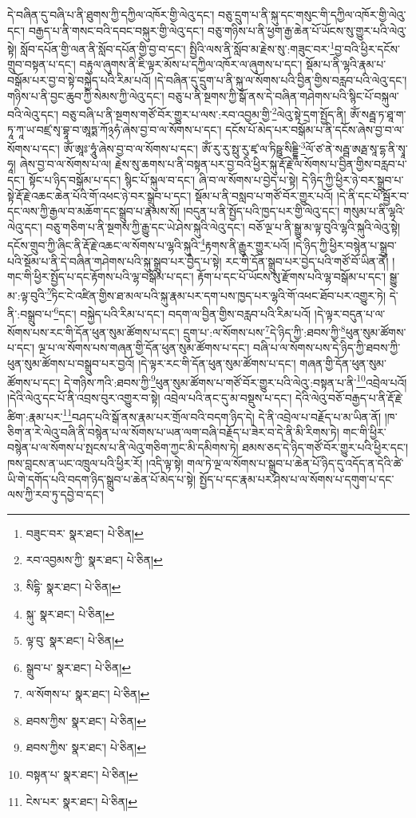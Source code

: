 དེ་བཞིན་དུ་བཞི་པ་ནི་ཐུགས་ཀྱི་དཀྱིལ་འཁོར་གྱི་ལེའུ་དང་། བཅུ་དྲུག་པ་ནི་སྐུ་དང་གསུང་གི་དཀྱིལ་འཁོར་གྱི་ལེའུ་དང་། བརྒྱད་པ་ནི་གསང་བའི་དབང་བསྐུར་གྱི་ལེའུ་དང་། བཅུ་གཉིས་པ་ནི་ཕྱག་རྒྱ་ཆེན་པོ་ཡོངས་སུ་གྱུར་པའི་ལེའུ་སྟེ། སློབ་དཔོན་གྱི་ལན་ནི་སློབ་དཔོན་གྱི་བྱ་བ་དང་། སྤྱིའི་ལས་ནི་སློབ་མ་རྗེས་སུ་:གཟུང་བར་\footnote{བཟུང་བར་  སྣར་ཐང་།  པེ་ཅིན། }བྱ་བའི་ཕྱིར་དངོས་གྲུབ་བསྟན་པ་དང་། བརྟུལ་ཞུགས་ནི་ཇི་ལྟར་མོས་པ་དཀྱིལ་འཁོར་ལ་ཞུགས་པ་དང་། སྡོམ་པ་ནི་ལྷའི་རྣམ་པ་བསྒོམ་པར་བྱ་བ་སྟེ་བསྐྱེད་པའི་རིམ་པའོ། །དེ་བཞིན་དུ་དྲུག་པ་ནི་སྐུ་ལ་སོགས་པའི་བྱིན་གྱིས་བརླབ་པའི་ལེའུ་དང་། གཉིས་པ་ནི་བྱང་ཆུབ་ཀྱི་སེམས་ཀྱི་ལེའུ་དང་། བཅུ་པ་ནི་སྔགས་ཀྱི་སྒོ་ནས་དེ་བཞིན་གཤེགས་པའི་སྙིང་པོ་བསྐུལ་བའི་ལེའུ་དང་། བཅུ་བཞི་པ་ནི་སྔགས་གཙོ་བོར་གྱུར་པ་ལས་:རབ་འབྱམ་གྱི་\footnote{རབ་འབྱམས་ཀྱི་  སྣར་ཐང་།  པེ་ཅིན། }ལེའུ་སྟེ་དྲག་སྤྱོད་ནི། ཨོཾ་སརྦྦ་ཏ་ཐཱ་ག་ཏཱ་ཀཱ་ཡ་བཛྲ་སྭ་བྷཱ་བ་ཨཱཏྨ་ཀོ྅ཧཾ་ཞེས་བྱ་བ་ལ་སོགས་པ་དང་། དངོས་པོ་མེད་པར་བསྒོམ་པ་ནི་དངོས་ཞེས་བྱ་བ་ལ་སོགས་པ་དང་། ཨོཾ་ཨཱཿ་ཧཱུཾ་ཞེས་བྱ་བ་ལ་སོགས་པ་དང་། ཨོཾ་རུ་རུ་སྥུ་རུ་ཛྭ་ལ་ཏིཥྛ་སིདྡྷི་\footnote{སིདྷི་  སྣར་ཐང་།  པེ་ཅིན། }ལོ་ཙ་ནེ་སརྦྦ་ཨརྠ་སཱ་དྷ་ནི་སྭཱ་ཧཱ། ཞེས་བྱ་བ་ལ་སོགས་པ་ལ། རྗེས་སུ་ཆགས་པ་ནི་བསྟན་པར་བྱ་བའི་ཕྱིར་སྐུ་རྡོ་རྗེ་ལ་སོགས་པ་བྱིན་གྱིས་བརླབ་པ་དང་། སྟོང་པ་ཉིད་བསྒོམ་པ་དང་། སྙིང་པོ་སྐུལ་བ་དང་། ཞི་བ་ལ་སོགས་པ་བྱེད་པ་སྟེ། དེ་ཉིད་ཀྱི་ཕྱིར་ཉེ་བར་སྒྲུབ་པ་སྟེ་རྡོ་རྗེ་འཆང་ཆེན་པོའི་གོ་འཕང་ཉེ་བར་སྒྲུབ་པ་དང་། སྡོམ་པ་ནི་བསླབ་པ་གཙོ་བོར་གྱུར་པའོ། །དེ་ནི་དང་པོ་སྦྱོར་བ་དང་ལས་ཀྱི་རྒྱལ་བ་མཆོག་དང་སྒྲུབ་པ་རྣམས་སོ། །བདུན་པ་ནི་སྤྱོད་པའི་ཁྱད་པར་གྱི་ལེའུ་དང་། གསུམ་པ་ནི་ལྷའི་ལེའུ་དང་། བཅུ་གཅིག་པ་ནི་སྔགས་ཀྱི་རྒྱུ་དང་ཡེ་ཤེས་སྐུའི་ལེའུ་དང་། བཅོ་ལྔ་པ་ནི་སྒྱུ་མ་ལྟ་བུའི་ལྷའི་སྐུའི་ལེའུ་སྟེ། དངོས་གྲུབ་ཀྱི་ཞིང་ནི་རྡོ་རྗེ་འཆང་ལ་སོགས་པ་ལྷའི་སྐུའི་\footnote{སྐུ་  སྣར་ཐང་།  པེ་ཅིན། }རྟགས་ནི་རྒྱུར་གྱུར་པའོ། །དེ་ཉིད་ཀྱི་ཕྱིར་བསྙེན་པ་སྒྲུབ་པའི་སྡོམ་པ་ནི་དེ་བཞིན་གཤེགས་པའི་སྐུ་སྒྲུབ་པར་བྱེད་པ་སྟེ། རང་གི་དོན་སྒྲུབ་པར་བྱེད་པའི་གཙོ་བོ་ཡིན་ནོ། །གང་གི་ཕྱིར་སྤྱོད་པ་དང་རྟོགས་པའི་ལྷ་བསྒོམ་པ་དང་། རྟོག་པ་དང་པོ་ཡོངས་སུ་རྫོགས་པའི་ལྷ་བསྒོམ་པ་དང་། སྒྱུ་མ་:ལྟ་བུའི་\footnote{ལྟ་བུ་  སྣར་ཐང་།  པེ་ཅིན། }ཏིང་ངེ་འཛིན་གྱིས་ཐ་མལ་པའི་སྐུ་རྣམ་པར་དག་པས་ཁྱད་པར་ལྷའི་གོ་འཕང་ཐོབ་པར་འགྱུར་ཏེ། དེ་ནི་:བསྒྲུབ་པ་\footnote{སྒྲུབ་པ་  སྣར་ཐང་།  པེ་ཅིན། }དང་། བསྐྱེད་པའི་རིམ་པ་དང་། བདག་ལ་བྱིན་གྱིས་བརླབ་པའི་རིམ་པའོ། །དེ་ལྟར་བདུན་པ་ལ་སོགས་པས་རང་གི་དོན་ཕུན་སུམ་ཚོགས་པ་དང་། དྲུག་པ་:ལ་སོགས་པས་\footnote{ལ་སོགས་པ་  སྣར་ཐང་།  པེ་ཅིན། }དེ་ཉིད་ཀྱི་:ཐབས་ཀྱི་\footnote{ཐབས་ཀྱིས་  སྣར་ཐང་།  པེ་ཅིན། }ཕུན་སུམ་ཚོགས་པ་དང་། ལྔ་པ་ལ་སོགས་པས་གཞན་གྱི་དོན་ཕུན་སུམ་ཚོགས་པ་དང་། བཞི་པ་ལ་སོགས་པས་དེ་ཉིད་ཀྱི་ཐབས་ཀྱི་ཕུན་སུམ་ཚོགས་པ་བསྒྲུབ་པར་བྱའོ། །དེ་ལྟར་རང་གི་དོན་ཕུན་སུམ་ཚོགས་པ་དང་། གཞན་གྱི་དོན་ཕུན་སུམ་ཚོགས་པ་དང་། དེ་གཉིས་ཀའི་:ཐབས་ཀྱི་\footnote{ཐབས་ཀྱིས་  སྣར་ཐང་།  པེ་ཅིན། }ཕུན་སུམ་ཚོགས་པ་གཙོ་བོར་གྱུར་པའི་ལེའུ་:བསྟན་པ་ནི་\footnote{བསྟན་པ་  སྣར་ཐང་།  པེ་ཅིན། }འབྲེལ་པའོ། །དེའི་ལེའུ་དང་པོ་ནི་འབྲས་བུར་འགྱུར་བ་སྟེ། འབྲེལ་པའི་ནང་དུ་མ་བསྡུས་པ་དང་། དེའི་ལེའུ་བཅོ་བརྒྱད་པ་ནི་རྡོ་རྗེ་ཚིག་:རྣམ་པར་\footnote{ངེས་པར་  སྣར་ཐང་།  པེ་ཅིན། }བཤད་པའི་སྒོ་ནས་རྣམ་པར་གྲོལ་བའི་བདག་ཉིད་དེ། དེ་ནི་འབྲེལ་པ་བརྗོད་པ་མ་ཡིན་ནོ། །ཁ་ཅིག་ན་རེ་ལེའུ་བཞི་ནི་བསྙེན་པ་ལ་སོགས་པ་ཡན་ལག་བཞི་བརྗོད་པ་ཟེར་བ་དེ་ནི་མི་རིགས་ཏེ། གང་གི་ཕྱིར་བསྙེན་པ་ལ་སོགས་པ་སྤངས་པ་ནི་ལེའུ་གཅིག་ཀྱང་མི་དམིགས་ཏེ། ཐམས་ཅད་དེ་ཉིད་གཙོ་བོར་གྱུར་པའི་ཕྱིར་དང་། ཁས་བླངས་ན་ཡང་འཁྲུལ་པའི་ཕྱིར་རོ། །འདི་ལྟ་སྟེ། གལ་ཏེ་ལྔ་ལ་སོགས་པ་སྒྲུབ་པ་ཆེན་པོ་ཉིད་དུ་འདོད་ན་དེའི་ཚེ་ཡི་གེ་དགོད་པའི་བདག་ཉིད་སྒྲུབ་པ་ཆེན་པོ་མེད་པ་སྟེ། སྤྱོད་པ་དང་རྣམ་པར་ཤེས་པ་ལ་སོགས་པ་དགུག་པ་དང་ལས་ཀྱི་རབ་ཏུ་དབྱེ་བ་དང་། 